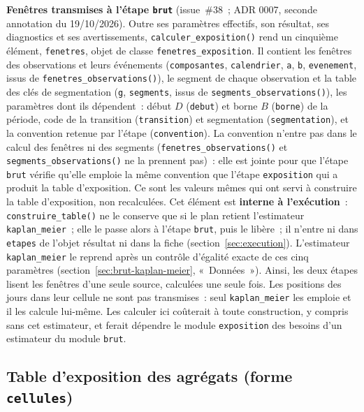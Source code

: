 \documentclass[a4paper,11pt]{article}
\newcommand{\code}[1]{\texttt{\small #1}}
\begin{document}
\medskip
\textbf{Fenêtres transmises à l'étape \code{brut}} (issue~\#38~; ADR 0007,
seconde annotation du 19/10/2026). Outre ses paramètres effectifs, son
résultat, ses diagnostics et ses avertissements, \code{calculer\_exposition()}
rend un cinquième élément, \code{fenetres}, objet de classe
\code{fenetres\_exposition}. Il contient les fenêtres des observations et
leurs événements (\code{composantes}, \code{calendrier}, \code{a}, \code{b},
\code{evenement}, issus de \code{fenetres\_observations()}), le segment de
chaque observation et la table des clés de segmentation (\code{g},
\code{segments}, issus de \code{segments\_observations()}), les paramètres
dont ils dépendent~: début $D$ (\code{debut}) et borne $B$ (\code{borne}) de
la période, code de la transition (\code{transition}) et segmentation
(\code{segmentation}), et la convention retenue par l'étape
(\code{convention}). La convention n'entre pas dans le calcul des fenêtres ni
des segments (\code{fenetres\_observations()} et
\code{segments\_observations()} ne la prennent pas)~: elle est jointe pour
que l'étape \code{brut} vérifie qu'elle emploie la même convention que
l'étape \code{exposition} qui a produit la table d'exposition. Ce sont les valeurs mêmes qui ont servi à construire
la table d'exposition, non recalculées. Cet élément est \textbf{interne à
l'exécution}~: \code{construire\_table()} ne le conserve que si le plan
retient l'estimateur \code{kaplan\_meier}~; elle le passe alors à l'étape
\code{brut}, puis le libère~; il n'entre ni dans \code{etapes} de l'objet résultat ni dans la
fiche (section~\ref{sec:execution}). L'estimateur \code{kaplan\_meier} le
reprend après un contrôle d'égalité exacte de ces cinq paramètres
(section~\ref{sec:brut-kaplan-meier}, «~Données~»). Ainsi, les deux étapes
lisent les fenêtres d'une seule source, calculées une seule fois. Les
positions des jours dans leur cellule ne sont pas transmises~: seul
\code{kaplan\_meier} les emploie et il les calcule lui-même. Les calculer ici
coûterait à toute construction, y compris sans cet estimateur, et ferait
dépendre le module \code{exposition} des besoins d'un estimateur du module
\code{brut}.

\subsection{Table d'exposition des agrégats (forme \code{cellules})}
\label{sec:exposition-cellules}
\end{document}
